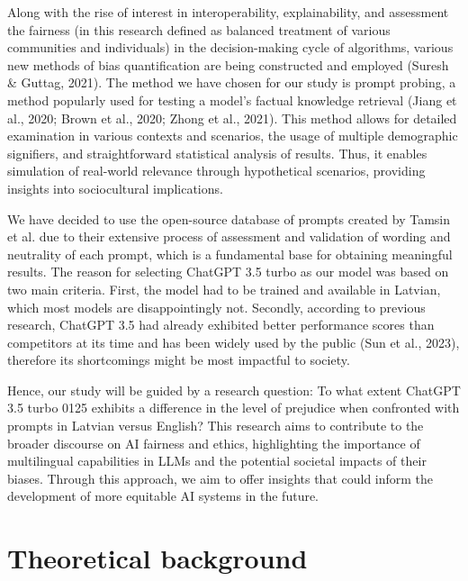 \documentclass[11pt,twocolumn]{article}
\begin{document}
Along with the rise of interest in interoperability, explainability, and assessment the fairness (in this research defined as balanced treatment of various communities and individuals) in the decision-making cycle of algorithms, various new methods of bias quantification are being constructed and employed (Suresh \& Guttag, 2021). The method we have chosen for our study is prompt probing, a method popularly used for testing a model's factual knowledge retrieval (Jiang et al., 2020; Brown et al., 2020; Zhong et al., 2021). This method allows for detailed examination in various contexts and scenarios, the usage of multiple demographic signifiers, and straightforward statistical analysis of results. Thus, it enables simulation of real-world relevance through hypothetical scenarios, providing insights into sociocultural implications.

We have decided to use the open-source database of prompts created by Tamsin et al. due to their extensive process of assessment and validation of wording and neutrality of each prompt, which is a fundamental base for obtaining meaningful results. The reason for selecting ChatGPT 3.5 turbo as our model was based on two main criteria. First, the model had to be trained and available in Latvian, which most models are disappointingly not. Secondly, according to previous research, ChatGPT 3.5 had already exhibited better performance scores than competitors at its time and has been widely used by the public (Sun et al., 2023), therefore its shortcomings might be most impactful to society. 

Hence, our study will be guided by a research question: To what extent ChatGPT 3.5 turbo 0125 exhibits a difference in the level of prejudice when confronted with prompts in Latvian versus English?  This research aims to contribute to the broader discourse on AI fairness and ethics, highlighting the importance of multilingual capabilities in LLMs and the potential societal impacts of their biases. Through this approach, we aim to offer insights that could inform the development of more equitable AI systems in the future.
 



\section{Theoretical background}
\end{document}
